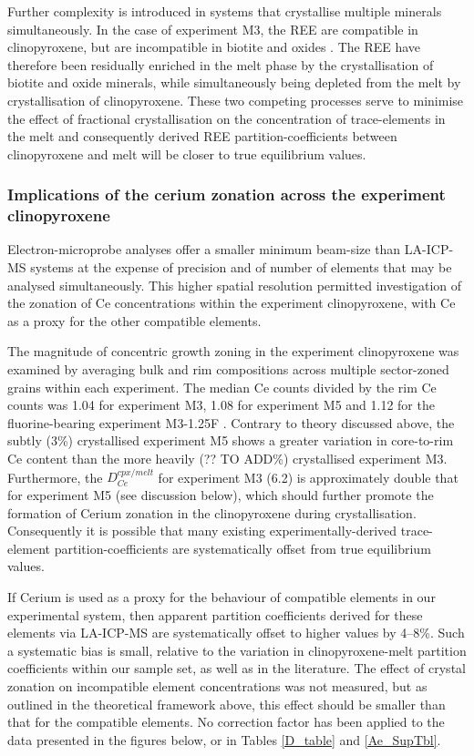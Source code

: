     Further complexity is introduced in systems that crystallise multiple minerals simultaneously. In the case of experiment M3, the REE are compatible in clinopyroxene, but are incompatible in biotite and oxides \citep[e.g.][]{Mahood1990,Schmidt1999}. The REE have therefore been residually enriched in the melt phase by the crystallisation of biotite and oxide minerals, while simultaneously being depleted from the melt by crystallisation of clinopyroxene. These two competing processes serve to minimise the effect of fractional crystallisation on the concentration of trace-elements in the melt and consequently derived REE partition-coefficients between clinopyroxene and melt will be closer to true equilibrium values.

\subsubsection{Implications of the cerium zonation across the experiment clinopyroxene}
    Electron-microprobe analyses offer a smaller minimum beam-size than LA-ICP-MS systems at the expense of precision and of number of elements that may be analysed simultaneously. This higher spatial resolution permitted investigation of the zonation of Ce concentrations within the experiment clinopyroxene, with Ce as a proxy for the other compatible elements.


The magnitude of concentric growth zoning in the experiment clinopyroxene was examined by averaging bulk and rim compositions across multiple sector-zoned grains within each experiment. The median Ce counts divided by the rim Ce counts was 1.04 for experiment M3, 1.08 for experiment M5 and 1.12 for the fluorine-bearing experiment M3-1.25F \citep[see][]{Beard_PhD_Thesis}. Contrary to theory discussed above, the subtly (3\%) crystallised experiment M5 shows a greater variation in core-to-rim Ce content than the more heavily (?? TO ADD\%) crystallised experiment M3. Furthermore, the $D_{Ce}^{cpx/melt}$ for experiment M3 (6.2) is approximately double that for experiment M5 (see discussion below), which should further promote the formation of Cerium zonation in the clinopyroxene during crystallisation. Consequently it is possible that many existing experimentally-derived trace-element partition-coefficients are systematically offset from true equilibrium values.

If Cerium is used as a proxy for the behaviour of compatible elements in our experimental system, then apparent partition coefficients derived for these elements via LA-ICP-MS are systematically offset to higher values by 4--8\%. Such a systematic bias is small, relative to the variation in clinopyroxene-melt partition coefficients within our sample set, as well as in the literature. The effect of crystal zonation on incompatible element concentrations was not measured, but as outlined in the theoretical framework above, this effect should be smaller than that for the compatible elements. No correction factor has been applied to the data presented in the figures below, or in Tables \ref{D_table} and \ref{Ae_SupTbl}. 